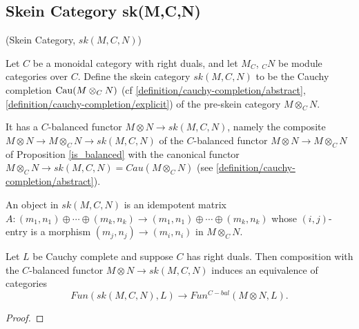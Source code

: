 \subsection{Skein Category sk(M,C,N)}

\begin{definition} (Skein Category, $sk(M,C,N)$)

  \noindent Let $C$ be a monoidal category with right duals, and let $M_C$,
  $_{C}N$ be module categories over $C$. Define the skein category $sk(M,C,N)$
  to be the Cauchy completion $\operatorname{Cau}(M \otimes_{C} N)$
  (cf \ref{definition/cauchy-completion/abstract}, \ref{definition/cauchy-completion/explicit})
  of the pre-skein category $M \otimes_{C} N$.
\end{definition}

\noindent It has a $C$-balanced functor $M\otimes N \to sk(M,C,N)$, namely the
composite $M\otimes N\to M\otimes_C N\to sk(M,C,N)$ of the $C$-balanced
functor $M\otimes N\to M\otimes_C N$ of Proposition \ref{is_balanced} with the
canonical functor $M\otimes_C N\to sk(M,C,N)=Cau(M\otimes_C N)$
(see \ref{definition/cauchy-completion/abstract}).

\begin{remark}
  An object in $sk(M,C,N)$ is an idempotent matrix
  $A:(m_1,n_1)\oplus\cdots\oplus (m_k,n_k)\to (m_1,n_1)\oplus\cdots\oplus
  (m_k,n_k)$ whose $(i,j)$-entry is a morphism $(m_j,n_j)\to (m_i,n_i)$ in
  $M\otimes_C N$.
\end{remark}

\begin{proposition}\label{univ_sk}
  Let $L$ be Cauchy complete and suppose $C$ has right duals. Then composition
  with the $C$-balanced functor $M\otimes N\to sk(M,C,N)$ induces an
  equivalence of categories $$Fun(sk(M,C,N),L)\to Fun^{C-bal}(M\otimes N,L).$$
\end{proposition}

\begin{proof}
\end{proof}

